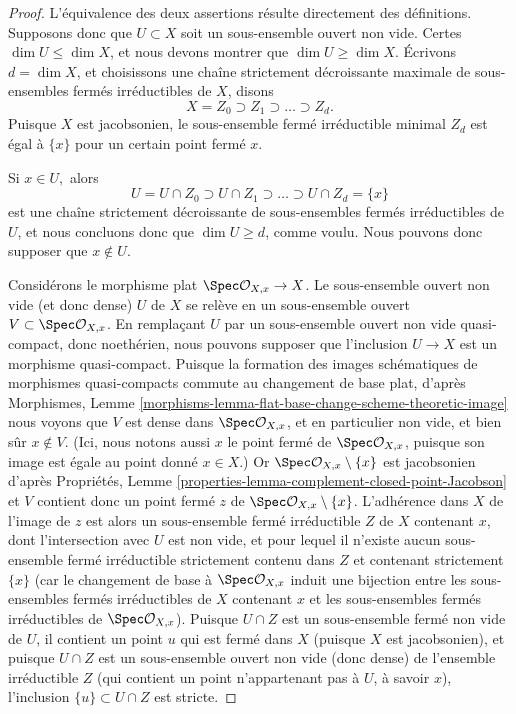 \begin{proof}
L'équivalence des deux assertions résulte directement des
définitions. Supposons donc que $U\subset X$ soit un sous-ensemble ouvert
non vide.
Certes $\dim U \leq \dim X$, et nous devons montrer
que $\dim U \geq \dim X.$
Écrivons $d = \dim X$, et choisissons une chaîne strictement
décroissante maximale de sous-ensembles fermés irréductibles
de $X$, disons
$$
X = Z_0 \supset Z_1 \supset \ldots \supset Z_d.
$$
Puisque $X$ est jacobsonien, le sous-ensemble fermé irréductible
minimal $Z_d$ est égal à $\{x\}$ pour un certain
point fermé $x$.

\medskip\noindent
Si $x \in U,$ alors
$$
U = U \cap Z_0  \supset U\cap Z_1 \supset \ldots \supset
U\cap Z_d = \{x\}
$$
est une chaîne strictement décroissante de sous-ensembles fermés
irréductibles de $U$, et nous concluons donc que $\dim U \geq d$,
comme voulu. Nous pouvons donc supposer que $x \not\in U.$

\medskip\noindent
Considérons le morphisme plat $\Spec \mathcal{O}_{X,x} \to X$.
Le sous-ensemble ouvert non vide (et donc dense) $U$ de $X$
se relève en un sous-ensemble ouvert $V \subset \Spec \mathcal{O}_{X,x}$.
En remplaçant $U$ par un sous-ensemble ouvert non vide quasi-compact, donc
noethérien, nous pouvons supposer que l'inclusion
$U \to X$ est un morphisme quasi-compact. Puisque la
formation des images schématiques de morphismes quasi-compacts
commute au changement de base plat, d'après
Morphismes, Lemme
\ref{morphisms-lemma-flat-base-change-scheme-theoretic-image}
nous voyons que $V$ est dense dans $\Spec \mathcal{O}_{X,x}$,
et en particulier non vide,
et bien sûr $x \not\in V.$ (Ici, nous notons aussi $x$
le point fermé de $\Spec \mathcal{O}_{X,x}$, puisque son image
est égale au point donné $x \in X$.)
Or $\Spec \mathcal{O}_{X,x} \setminus \{x\}$ est jacobsonien d'après
Propriétés, Lemme
\ref{properties-lemma-complement-closed-point-Jacobson}
et $V$ contient donc un point fermé $z$
de $\Spec \mathcal{O}_{X,x} \setminus \{x\}$. L'adhérence
dans $X$ de l'image de $z$ est alors un sous-ensemble
fermé irréductible $Z$ de $X$ contenant $x$, dont l'intersection
avec $U$ est non vide, et
pour lequel il n'existe aucun sous-ensemble fermé
irréductible strictement contenu dans $Z$
et contenant strictement $\{x\}$
(car le changement de base à $\Spec \mathcal{O}_{X,x}$ induit
une bijection entre les sous-ensembles fermés irréductibles de $X$
contenant $x$ et les sous-ensembles fermés irréductibles de $\Spec
\mathcal{O}_{X,x}$).
Puisque $U \cap Z$ est un sous-ensemble fermé non vide de $U$,
il contient un point $u$ qui est fermé dans $X$ (puisque
$X$ est jacobsonien), et puisque $U\cap Z$
est un sous-ensemble ouvert non vide (donc dense) de l'ensemble irréductible $Z$
(qui contient un point n'appartenant pas à $U$, à savoir $x$),
l'inclusion $\{u\} \subset U\cap Z$ est stricte.


\end{proof}
